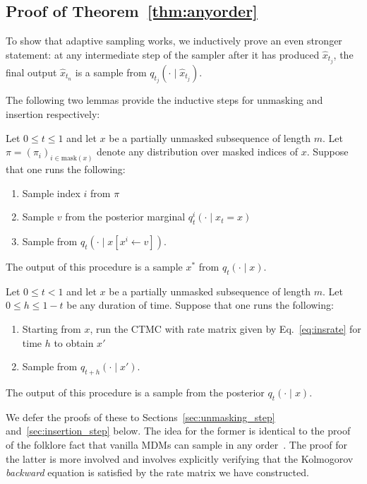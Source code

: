 \subsection{Proof of Theorem~\ref{thm:anyorder}}

To show that adaptive sampling works, we inductively prove an even stronger statement: at any intermediate step of the sampler after it has produced $\hat{x}_{t_j}$, the final output $\hat{x}_{t_n}$ is a sample from $q_{t_j}(\cdot \mid \hat{x}_{t_j})$.

The following two lemmas provide the inductive steps for unmasking and insertion respectively:

\begin{applem}\label{lem:unmasking_step}
    Let $0 \le t \le 1$ and let $x$ be a partially unmasked subsequence of length $m$. Let $\pi = (\pi_i)_{i\in \mathrm{mask}(x)}$ denote any distribution over masked indices of $x$.
    Suppose that one runs the following:
    \begin{enumerate}[leftmargin=*,itemsep=0pt,topsep=0pt]
        \item Sample index $i$ from $\pi$ 
        \item Sample $v$ from the posterior marginal $q^i_t(\cdot \mid x_t = x)$
        \item Sample from $q_t(\cdot \mid x[x^i\gets v])$.
    \end{enumerate}
    The output of this procedure is a sample $x^*$ from $q_t(\cdot \mid x)$.
\end{applem}

\begin{applem}\label{lem:insertion_step}
    Let $0 \le t < 1$ and let $x$ be a partially unmasked subsequence of length $m$. Let $0\le h \le 1 - t$ be any duration of time. Suppose that one runs the following:
    \begin{enumerate}[leftmargin=*,itemsep=0pt,topsep=0pt] 
        \item Starting from $x$, run the CTMC with rate matrix
        given by Eq.~\eqref{eq:insrate} for time $h$ to obtain $x'$
        \item Sample from $q_{t+h}(\cdot \mid x')$.
    \end{enumerate}
    The output of this procedure is a sample from the posterior $q_t(\cdot \mid x)$.
\end{applem}

\noindent We defer the proofs of these to Sections~\ref{sec:unmasking_step} and~\ref{sec:insertion_step} below. The idea for the former is identical to the proof of the folklore fact that vanilla MDMs can sample in any order~\citep{kim2025train}. The proof for the latter is more involved and involves explicitly verifying that the Kolmogorov \emph{backward} equation is satisfied by the rate matrix we have constructed.

